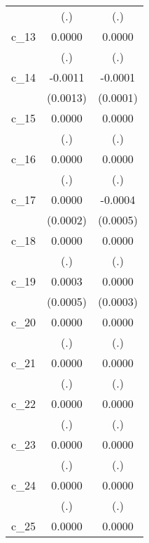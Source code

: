 {\begin{tabular}{l*{2}{c}}
            &         (.)        &         (.)        \\
[1em]
c\_13        &      0.0000        &      0.0000        \\
            &         (.)        &         (.)        \\
[1em]
c\_14        &     -0.0011        &     -0.0001        \\
            &    (0.0013)        &    (0.0001)        \\
[1em]
c\_15        &      0.0000        &      0.0000        \\
            &         (.)        &         (.)        \\
[1em]
c\_16        &      0.0000        &      0.0000        \\
            &         (.)        &         (.)        \\
[1em]
c\_17        &      0.0000        &     -0.0004        \\
            &    (0.0002)        &    (0.0005)        \\
[1em]
c\_18        &      0.0000        &      0.0000        \\
            &         (.)        &         (.)        \\
[1em]
c\_19        &      0.0003        &      0.0000        \\
            &    (0.0005)        &    (0.0003)        \\
[1em]
c\_20        &      0.0000        &      0.0000        \\
            &         (.)        &         (.)        \\
[1em]
c\_21        &      0.0000        &      0.0000        \\
            &         (.)        &         (.)        \\
[1em]
c\_22        &      0.0000        &      0.0000        \\
            &         (.)        &         (.)        \\
[1em]
c\_23        &      0.0000        &      0.0000        \\
            &         (.)        &         (.)        \\
[1em]
c\_24        &      0.0000        &      0.0000        \\
            &         (.)        &         (.)        \\
[1em]
c\_25        &      0.0000        &      0.0000        \\

\end{tabular}}
